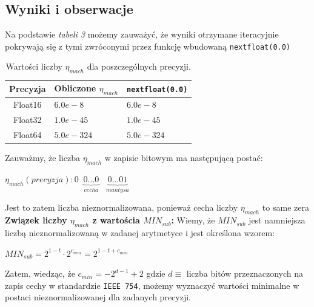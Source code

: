 \documentclass[12pt]{article}
\begin{document}
    \subsection*{Wyniki i obserwacje}
        Na podstawie \textit{tabeli 3} możemy zauważyć, że wyniki otrzymane iteracyjnie pokrywają się
        z tymi zwróconymi przez funkcję wbudowaną \texttt{nextfloat(0.0)}

        \begin{table}[h!]
            \centering
            \begin{tabularx}{0.52\textwidth}{c l l}
                \hline
                Precyzja & Obliczone $\eta_{mach}$ & \texttt{nextfloat(0.0)} \\
                \hline
                Float16 & $6.0e-8$ & $6.0e-8$ \\
                Float32 & $1.0e-45$ & $1.0e-45$ \\
                Float64 & $5.0e-324$ & $5.0e-324$ \\
                \hline
            \end{tabularx}
            \caption{Wartości liczby $\eta_{mach}$ dla poszczególnych precyzji.}
            \label{table:macheta}
        \end{table}

        \noindent Zauważmy, że liczba $\eta_{mach}$ w zapisie bitowym ma następującą postać:
        \begin{center}
        \begin{math}
            \eta_{mach}(precyzja) : 0 \;\; \underbrace{0...0}_{cecha} \;\;\; \underbrace{0...01}_{mantysa}
        \end{math}
        \end{center}
        Jest to zatem liczba nieznormalizowana, ponieważ cecha liczby $\eta_{mach}$ to same zera
        \newline\newline\newline
        \noindent\textbf{Związek liczby $\eta_{mach}$ z wartościa $MIN_{sub}$:}
        \newline
        Wiemy, że $MIN_{sub}$ jest namniejsza liczbą nieznormalizowaną w zadanej arytmetyce i jest określona wzorem:
        \begin{center}
        \begin{math}
            MIN_{sub} = 2^{1 - t} \cdot 2^{c_{min}} = 2^{1 - t + c_{min}}
        \end{math}
        \end{center}
        Zatem, wiedząc, że $c_{min} = -2^{d-1} + 2$ gdzie $d \equiv$ liczba bitów przeznaczonych na zapis cechy w standardzie \texttt{IEEE 754},
        możemy wyznaczyć wartości minimalne w postaci nieznormalizowanej dla zadanych precyzji.
\end{document}
